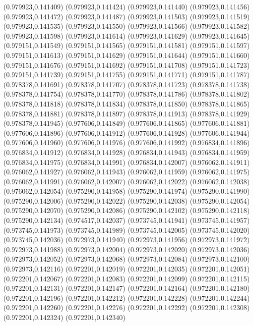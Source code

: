 (0.979923,0.141409)
(0.979923,0.141424)
(0.979923,0.141440)
(0.979923,0.141456)
(0.979923,0.141472)
(0.979923,0.141487)
(0.979923,0.141503)
(0.979923,0.141519)
(0.979923,0.141535)
(0.979923,0.141550)
(0.979923,0.141566)
(0.979923,0.141582)
(0.979923,0.141598)
(0.979923,0.141614)
(0.979923,0.141629)
(0.979923,0.141645)
(0.979151,0.141549)
(0.979151,0.141565)
(0.979151,0.141581)
(0.979151,0.141597)
(0.979151,0.141613)
(0.979151,0.141629)
(0.979151,0.141644)
(0.979151,0.141660)
(0.979151,0.141676)
(0.979151,0.141692)
(0.979151,0.141708)
(0.979151,0.141723)
(0.979151,0.141739)
(0.979151,0.141755)
(0.979151,0.141771)
(0.979151,0.141787)
(0.978378,0.141691)
(0.978378,0.141707)
(0.978378,0.141723)
(0.978378,0.141738)
(0.978378,0.141754)
(0.978378,0.141770)
(0.978378,0.141786)
(0.978378,0.141802)
(0.978378,0.141818)
(0.978378,0.141834)
(0.978378,0.141850)
(0.978378,0.141865)
(0.978378,0.141881)
(0.978378,0.141897)
(0.978378,0.141913)
(0.978378,0.141929)
(0.978378,0.141945)
(0.977606,0.141849)
(0.977606,0.141865)
(0.977606,0.141881)
(0.977606,0.141896)
(0.977606,0.141912)
(0.977606,0.141928)
(0.977606,0.141944)
(0.977606,0.141960)
(0.977606,0.141976)
(0.977606,0.141992)
(0.976834,0.141896)
(0.976834,0.141912)
(0.976834,0.141928)
(0.976834,0.141943)
(0.976834,0.141959)
(0.976834,0.141975)
(0.976834,0.141991)
(0.976834,0.142007)
(0.976062,0.141911)
(0.976062,0.141927)
(0.976062,0.141943)
(0.976062,0.141959)
(0.976062,0.141975)
(0.976062,0.141991)
(0.976062,0.142007)
(0.976062,0.142022)
(0.976062,0.142038)
(0.976062,0.142054)
(0.975290,0.141958)
(0.975290,0.141974)
(0.975290,0.141990)
(0.975290,0.142006)
(0.975290,0.142022)
(0.975290,0.142038)
(0.975290,0.142054)
(0.975290,0.142070)
(0.975290,0.142086)
(0.975290,0.142102)
(0.975290,0.142118)
(0.975290,0.142134)
(0.974517,0.142037)
(0.973745,0.141941)
(0.973745,0.141957)
(0.973745,0.141973)
(0.973745,0.141989)
(0.973745,0.142005)
(0.973745,0.142020)
(0.973745,0.142036)
(0.972973,0.141940)
(0.972973,0.141956)
(0.972973,0.141972)
(0.972973,0.141988)
(0.972973,0.142004)
(0.972973,0.142020)
(0.972973,0.142036)
(0.972973,0.142052)
(0.972973,0.142068)
(0.972973,0.142084)
(0.972973,0.142100)
(0.972973,0.142116)
(0.972201,0.142019)
(0.972201,0.142035)
(0.972201,0.142051)
(0.972201,0.142067)
(0.972201,0.142083)
(0.972201,0.142099)
(0.972201,0.142115)
(0.972201,0.142131)
(0.972201,0.142147)
(0.972201,0.142164)
(0.972201,0.142180)
(0.972201,0.142196)
(0.972201,0.142212)
(0.972201,0.142228)
(0.972201,0.142244)
(0.972201,0.142260)
(0.972201,0.142276)
(0.972201,0.142292)
(0.972201,0.142308)
(0.972201,0.142324)
(0.972201,0.142340)
